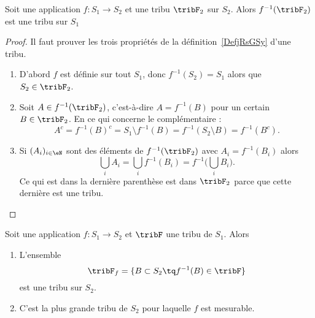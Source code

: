 \begin{lemma}       \label{LemooVDXJooZNYelH}
	Soit une application \( f\colon S_1\to S_2\) et une tribu \( \tribF_2\) sur \( S_2\). Alors \( f^{-1}(\tribF_2)\) est une tribu sur \( S_1\)
\end{lemma}

\begin{proof}
	Il faut prouver les trois propriétés de la définition~\ref{DefjRsGSy} d'une tribu.
	\begin{enumerate}
		\item
		      D'abord \( f\) est définie sur tout \( S_1\), donc \( f^{-1}(S_2)=S_1\) alors que \( S_2\in \tribF_2\).
		\item
		      Soit \( A\in f^{-1}(\tribF_2)\), c'est-à-dire \( A=f^{-1}(B)\) pour un certain \( B\in \tribF_2\). En ce qui concerne le complémentaire :
		      \begin{equation}
			      A^c=f^{-1}(B)^c=S_1\setminus f^{-1}(B)=f^{-1}(S_2\setminus B)=f^{-1}(B^c).
		      \end{equation}
		\item
		      Si \( (A_i)_{i\in \eN}\) sont des éléments de \( f^{-1}(\tribF_2)\) avec \( A_i=f^{-1}(B_i)\) alors
		      \begin{equation}
			      \bigcup_iA_i=\bigcup_if^{-1}(B_i)=f^{-1}\big( \bigcup_iB_i \big).
		      \end{equation}
		      Ce qui est dans la dernière parenthèse est dans \( \tribF_2\) parce que cette dernière est une tribu.
	\end{enumerate}
\end{proof}

\begin{lemma}       \label{LemJYKBooBSXBXJ}
	Soit une application \( f\colon S_1\to S_2\) et \( \tribF\) une tribu de \( S_1\). Alors
	\begin{enumerate}
		\item
		      L'ensemble
		      \begin{equation}
			      \tribF_f=\{  B\subset S_2\tq f^{-1}(B)\in \tribF  \}
		      \end{equation}
		      est une tribu sur \( S_2\).
		\item
		      C'est la plus grande tribu de \( S_2\) pour laquelle \( f\) est mesurable.
	\end{enumerate}
\end{lemma}


